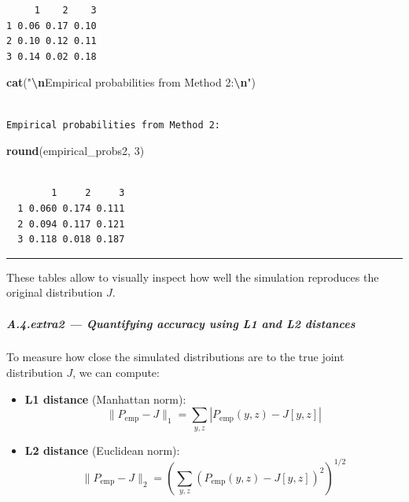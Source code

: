 \documentclass[
]{article}
\newenvironment{Shaded}{\begin{snugshade}}{\end{snugshade}}
\newcommand{\DecValTok}[1]{\textcolor[rgb]{0.00,0.00,0.81}{#1}}
\newcommand{\FunctionTok}[1]{\textcolor[rgb]{0.13,0.29,0.53}{\textbf{#1}}}
\newcommand{\NormalTok}[1]{#1}
\newcommand{\SpecialCharTok}[1]{\textcolor[rgb]{0.81,0.36,0.00}{\textbf{#1}}}
\newcommand{\StringTok}[1]{\textcolor[rgb]{0.31,0.60,0.02}{#1}}
\begin{document}
\begin{verbatim}
     1    2    3
1 0.06 0.17 0.10
2 0.10 0.12 0.11
3 0.14 0.02 0.18
\end{verbatim}

\begin{Shaded}
\begin{Highlighting}[]
\FunctionTok{cat}\NormalTok{(}\StringTok{"}\SpecialCharTok{\textbackslash{}n}\StringTok{Empirical probabilities from Method 2:}\SpecialCharTok{\textbackslash{}n}\StringTok{"}\NormalTok{)}
\end{Highlighting}
\end{Shaded}

\begin{verbatim}

Empirical probabilities from Method 2:
\end{verbatim}

\begin{Shaded}
\begin{Highlighting}[]
\FunctionTok{round}\NormalTok{(empirical\_probs2, }\DecValTok{3}\NormalTok{)}
\end{Highlighting}
\end{Shaded}

\begin{verbatim}
   
        1     2     3
  1 0.060 0.174 0.111
  2 0.094 0.117 0.121
  3 0.118 0.018 0.187
\end{verbatim}

\begin{center}\rule{0.5\linewidth}{0.5pt}\end{center}

These tables allow to visually inspect how well the simulation
reproduces the original distribution \(J\).

\subparagraph{A.4.extra2 --- Quantifying accuracy using L1 and L2
distances}\label{a.4.extra2-quantifying-accuracy-using-l1-and-l2-distances}

To measure how close the simulated distributions are to the true joint
distribution \(J\), we can compute:

\begin{itemize}
\item
  \textbf{L1 distance} (Manhattan norm):\\
  \[
  \|P_{\text{emp}} - J\|_1 = \sum_{y,z} |P_{\text{emp}}(y,z) - J[y,z]|
  \]
\item
  \textbf{L2 distance} (Euclidean norm):\\
  \[
  \|P_{\text{emp}} - J\|_2 = \left( \sum_{y,z} (P_{\text{emp}}(y,z) - J[y,z])^2 \right)^{1/2}
  \]
\end{itemize}
\end{document}
